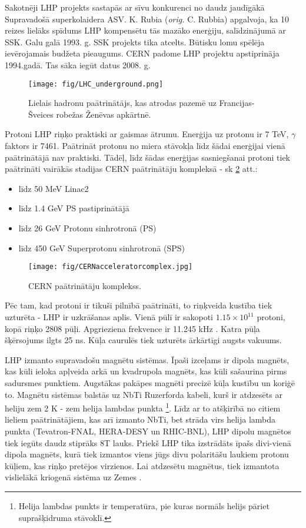 Sakotnēji LHP projekts sastapās ar sīvu konkurenci no daudz jaudīgākā Supravadošā superkolaidera ASV. K. Rubia (\textit{orig.} C. Rubbia) apgalvoja, ka 10 reizes lielāks spīdums LHP kompensētu tās mazāko enerģiju, salīdzinājumā ar SSK. Galu galā 1993. g. SSK projekts tika atcelts. Būtisku lomu spēlēja ievērojamais budžeta pieaugums. CERN padome LHP projektu apstiprināja 1994.gadā. Tas sāka iegūt datus 2008. g.

\begin{figure}[htpb]
  \centering
  \texttt{[image: fig/LHC\_underground.png]}
  \caption{Lielais hadronu paātrinātājs, kas atrodas pazemē uz Francijas-Šveices robežas Ženēvas apkārtnē.}
  \label{fig:LHC_underground}
\end{figure}

Protoni LHP riņķo praktiski ar gaismas ātrumu. Enerģija uz protonu ir 7 TeV, $\gamma$ faktors ir 7461. Paātrināt protonu no miera stāvokļa līdz šādai enerģijai vienā paātrinātājā nav praktiski. Tādēļ, līdz šādas enerģijas sasniegšanai protoni tiek paātrināti vairākās stadijas CERN paātrinātāju kompleksā - sk \ref{fig:CERN_accelerator_complex} att.:

\begin{itemize}
\item līdz 50 MeV Linac2
\item līdz 1.4 GeV PS \gls{pastiprinātājā}
\item līdz 26 GeV Protonu sinhrotronā (PS)
\item līdz 450 GeV Superprotonu sinhrotronā (SPS)
\end{itemize}

\begin{figure}[htpb]
  \centering
  \texttt{[image: fig/CERNacceleratorcomplex.jpg]}
  \caption{CERN paātrinātāju komplekss.}
  \label{fig:CERN_accelerator_complex}
\end{figure}

Pēc tam, kad protoni ir tikuši pilnībā paātrināti, to riņķveida kustība tiek uzturēta - LHP ir \gls{uzkrāšanas aplis}. Vienā \gls{pūlī} ir sakopoti $1.15\times10^{11}$ protoni, kopā riņķo 2808 pūļi. Apgrieziena frekvence ir 11.245 kHz \cite{Bruning:2004ej}. Katra pūļa šķērsojums ilgts 25 ns. Kūļa caurulēs tiek uzturēts ārkārtīgi augsts vakuums.

LHP izmanto supravadošu magnētu sistēmas. Īpaši izceļams ir dipola magnēts, kas kūli ieloka apļveida arkā un kvadrupola magnēts, kas kūli sašaurina pirms sadursmes punktiem. Augstākas pakāpes magnēti precizē kūļa kustību un koriģē to. Magnētu sistēmas balstās uz NbTi Ruzerforda kabeli, kurš ir atdzesēts ar heliju zem 2 K - zem helija lambdas punkta \footnote{Helija lambdas punkts ir temperatūra, pie kuras normāls helijs pāriet suprašķidruma stāvoklī.}. Līdz ar to atšķirībā no citiem lieliem paātrinātājiem, kas arī izmanto NbTi, bet strāda virs helija lambda punkta (Tevatron-FNAL, HERA-DESY un RHIC-BNL), LHP dipolu magnētos tiek iegūts daudz stiprāks 8T lauks. Priekš LHP tika izstrādāts īpašs divi-vienā dipola magnēts, kurā tiek izmantos viens jūgs divu polaritāšu laukiem protonu kūļiem, kas riņķo pretējos virzienos. Lai atdzesētu magnētus, tiek izmantota vislielākā kriogenā sistēma uz Zemes \cite{MYERS:2013hra} \cite{Evans:2008zzb}.

